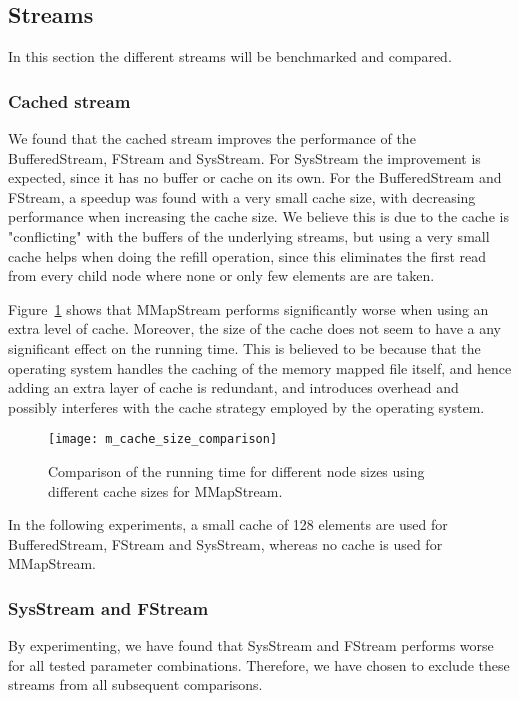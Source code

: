 \subsection{Streams}
In this section the different streams will be benchmarked and compared.

\subsubsection{Cached stream}
We found that the cached stream improves the performance of the BufferedStream, FStream and SysStream. For SysStream the improvement is expected, since it has no buffer or cache on its own. For the BufferedStream and FStream, a speedup was found with a very small cache size, with decreasing performance when increasing the cache size. We believe this is due to the cache is "conflicting" with the buffers of the underlying streams, but using a very small cache helps when doing the refill operation, since this eliminates the first read from every child node where none or only few elements are are taken.

Figure~\ref{fig:m-cache-size-comparison} shows that MMapStream performs significantly worse when using an extra level of cache. Moreover, the size of the cache does not seem to have a any significant effect on the running time. This is believed to be because that the operating system handles the caching of the memory mapped file itself, and hence adding an extra layer of cache is redundant, and introduces overhead and possibly interferes with the cache strategy employed by the operating system.

\begin{figure}
  \centering
  \texttt{[image: m\_cache\_size\_comparison]}
  \caption{Comparison of the running time for different node sizes using different cache sizes for MMapStream.}
  \label{fig:m-cache-size-comparison}
\end{figure}

In the following experiments, a small cache of 128 elements are used for BufferedStream, FStream and SysStream, whereas no cache is used for MMapStream.

\subsubsection{SysStream and FStream}
By experimenting, we have found that SysStream and FStream performs worse for all tested parameter combinations. Therefore, we have chosen to exclude these streams from all subsequent comparisons.

